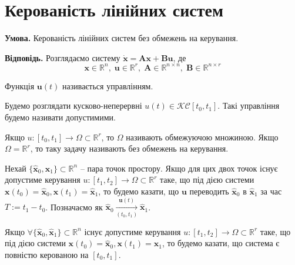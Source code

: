 \documentclass[14pt]{extarticle}
\newcommand{\<}{\langle}
\renewcommand{\>}{\rangle}
\theoremstyle{mystyle}{\newtheorem{definition}{Definition}[section]}
\theoremstyle{mystyle}{\newtheorem{proposition}[definition]{Proposition}}
\theoremstyle{mystyle}{\newtheorem{theorem}[definition]{Theorem}}
\theoremstyle{mystyle}{\newtheorem{lemma}[definition]{Lemma}}
\theoremstyle{mystyle}{\newtheorem{corollary}[definition]{Corollary}}
\theoremstyle{mystyle}{\newtheorem*{remark}{Remark}}
\theoremstyle{mystyle}{\newtheorem*{remarks}{Remarks}}
\theoremstyle{mystyle}{\newtheorem*{example}{Example}}
\theoremstyle{mystyle}{\newtheorem*{examples}{Examples}}
\theoremstyle{definition}{\newtheorem*{exercise}{Exercise}}
\theoremstyle{cstyle}{\newtheorem*{cthm}{}}
\theoremstyle{warn}
\begin{document}
\pagebreak

\section{Керованість лінійних систем}

\textbf{Умова.} Керованість лінійних систем без обмежень на керування.

\textbf{Відповідь.} Розглядаємо систему $\dot{\mathbf{x}} = \boldsymbol{A}\mathbf{x}+\boldsymbol{B}\mathbf{u}$, де
\begin{equation}
    \mathbf{x} \in \mathbb{R}^n, \; \mathbf{u} \in \mathbb{R}^r, \; \boldsymbol{A} \in \mathbb{R}^{n \times n}, \; \boldsymbol{B} \in \mathbb{R}^{n \times r}
\end{equation}

\begin{definition}
    Функція $\mathbf{u}(t)$ називається управлінням.
\end{definition}

Будемо розглядати кусково-неперервні $u(t) \in \mathcal{KC}[t_0,t_1]$. Такі управління будемо називати допустимими. 
\begin{definition}
    Якщо $u: [t_0,t_1] \to \Omega \subset \mathbb{R}^r$, то $\Omega$ називають обмежуючою множиною. Якщо $\Omega=\mathbb{R}^r$, то таку задачу називають без обмежень на керування.
\end{definition}

\begin{definition}
    Нехай $\{\hat{\mathbf{x}}_0,\hat{\mathbf{x}}_1\}\subset \mathbb{R}^n$ -- пара точок простору. Якщо для цих двох точок існує допустиме керування $u: [t_1,t_2] \to \Omega \subset \mathbb{R}^r$ таке, що під дією системи $\mathbf{x}(t_0)=\hat{\mathbf{x}}_0,\mathbf{x}(t_1)=\hat{\mathbf{x}}_1$, то будемо казати, що $\mathbf{u}$ переводить $\hat{\mathbf{x}}_0$ в $\hat{\mathbf{x}}_1$ за час $T:=t_1-t_0$. Позначаємо як $\hat{\mathbf{x}}_0 \xrightarrow[(t_0,t_1)]{\mathbf{u}(t)} \hat{\mathbf{x}}_1$.
\end{definition}

\begin{definition}
    Якщо $\forall\{\hat{\mathbf{x}}_0,\hat{\mathbf{x}}_1\}\subset \mathbb{R}^n$ існує допустиме керування $u: [t_1,t_2] \to \Omega \subset \mathbb{R}^r$ таке, що під дією системи $\mathbf{x}(t_0)=\hat{\mathbf{x}}_0,\mathbf{x}(t_1)=\hat{\mathbf{x}}_1$, то будемо казати, що система є повністю керованою на $[t_0,t_1]$.
\end{definition}
\end{document}
